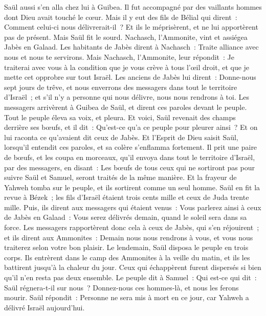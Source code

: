 \begin{multicols}{2}
Saül aussi s'en alla chez lui à Guibea. Il fut accompagné par des vaillants hommes dont Dieu avait touché le cœur.
Mais il y eut des fils de Bélial qui dirent~: Comment celui-ci nous délivrerait-il~? Et ils le méprisèrent, et ne lui apportèrent pas de présent. Mais Saül fit le sourd.
\VerseOne{}Nachasch, l'Ammonite, vint et assiégea Jabès en Galaad. Les habitants de Jabès dirent à Nachasch~: Traite alliance avec nous et nous te servirons.
Mais Nachasch, l'Ammonite, leur répondit~: Je traiterai avec vous à la condition que je vous crève à tous l'œil droit, et que je mette cet opprobre sur tout Israël.
Les anciens de Jabès lui dirent~: Donne-nous sept jours de trêve, et nous enverrons des messagers dans tout le territoire d'Israël~; et s'il n'y a personne qui nous délivre, nous nous rendrons à toi.
Les messagers arrivèrent à Guibea de Saül, et dirent ces paroles devant le peuple. Tout le peuple éleva sa voix, et pleura.
Et voici, Saül revenait des champs derrière ses bœufs, et il dit~: Qu'est-ce qu'a ce peuple pour pleurer ainsi~? Et on lui raconta ce qu'avaient dit ceux de Jabès.
Et l'Esprit de Dieu saisit Saül, lorsqu'il entendit ces paroles, et sa colère s'enflamma fortement.
Il prit une paire de bœufs, et les coupa en morceaux, qu'il envoya dans tout le territoire d'Israël, par des messagers, en disant~: Les bœufs de tous ceux qui ne sortiront pas pour suivre Saül et Samuel, seront traités de la même manière. Et la frayeur de Yahweh tomba sur le peuple, et ils sortirent comme un seul homme.
Saül en fit la revue à Bézek~; les fils d'Israël étaient trois cents mille et ceux de Juda trente mille.
Puis, ils dirent aux messagers qui étaient venus~: Vous parlerez ainsi à ceux de Jabès en Galaad~: Vous serez délivrés demain, quand le soleil sera dans sa force. Les messagers rapportèrent donc cela à ceux de Jabès, qui s'en réjouirent~;
et ils dirent aux Ammonites~: Demain nous nous rendrons à vous, et vous nous traiterez selon votre bon plaisir.
Le lendemain, Saül disposa le peuple en trois corps. Ils entrèrent dans le camp des Ammonites à la veille du matin, et ils les battirent jusqu'à la chaleur du jour. Ceux qui échappèrent furent dispersés si bien qu'il n'en resta pas deux ensemble.
Le peuple dit à Samuel~: Qui est-ce qui dit~: Saül régnera-t-il sur nous~? Donnez-nous ces hommes-là, et nous les ferons mourir.
Saül répondit~: Personne ne sera mis à mort en ce jour, car Yahweh a délivré Israël aujourd'hui.

\end{multicols}
